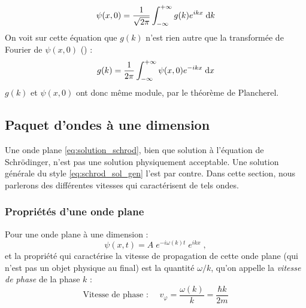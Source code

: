 $$\psi(x,0) = \dfrac{1}{\sqrt{2\pi}} \int_{-\infty} ^{+\infty} g(k) e^{ikx} \; \mathrm{d} k $$
On voit sur cette équation que $g(k)$ n'est rien autre que la transformée de Fourier de $\psi(x,0)$ ({\color{blue}{voir annexe sur notions de math}}) :
$$g(k) = \frac{1}{2 \pi}\int_{-\infty} ^{+\infty} \psi(x,0) e^{-ikx} \; \mathrm{d} x $$
$g(k)$ et $\psi(x,0)$ ont donc même module, par le théorème de Plancherel. 


\subsection{Paquet d'ondes à une dimension}
Une onde plane \eqref{eq:solution_schrod}, bien que solution à l'équation de Schrödinger, n'est pas une solution physiquement acceptable. Une solution générale du style \eqref{eq:schrod_sol_gen} l'est par contre. 
Dans cette section, nous parlerons des différentes vitesses qui caractérisent de tels ondes. 
\subsubsection{Propriétés d'une onde plane}
Pour une onde plane à une dimension :
$$\psi(x,t) = A \; e^{-i\omega(k) t} \; e ^{ikx} \; ,$$
et la propriété qui caractérise la vitesse de propagation de cette onde plane (qui n'est pas un objet physique au final) est la quantité $\omega/k$, qu'on appelle la \textit{vitesse de phase} de la phase $k$ :
\begin{equation}
\text{Vitesse de phase : } \quad v_\varphi = \dfrac{\omega(k)}{k} = \dfrac{\hbar k}{2m}
\end{equation}
